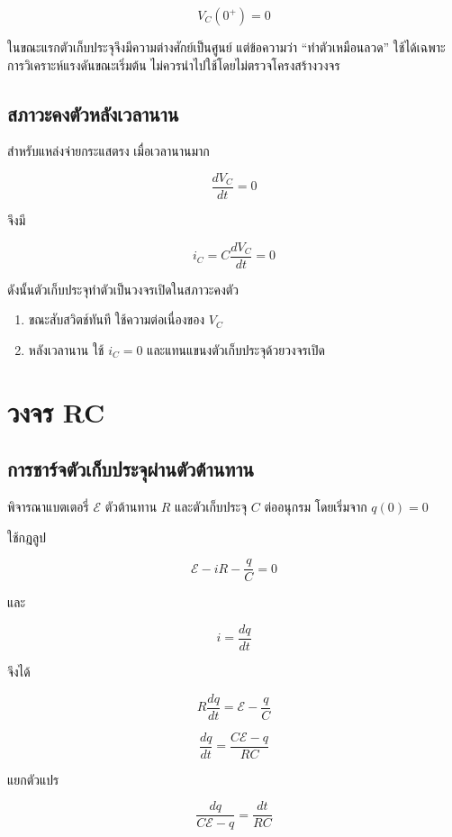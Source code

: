 \[
V_C(0^+)=0
\]

ในขณะแรกตัวเก็บประจุจึงมีความต่างศักย์เป็นศูนย์ แต่ข้อความว่า ``ทำตัวเหมือนลวด'' ใช้ได้เฉพาะการวิเคราะห์แรงดันขณะเริ่มต้น ไม่ควรนำไปใช้โดยไม่ตรวจโครงสร้างวงจร

\subsection{สภาวะคงตัวหลังเวลานาน}

สำหรับแหล่งจ่ายกระแสตรง เมื่อเวลานานมาก

\[
\frac{dV_C}{dt}=0
\]

จึงมี

\[
i_C=C\frac{dV_C}{dt}=0
\]

ดังนั้นตัวเก็บประจุทำตัวเป็นวงจรเปิดในสภาวะคงตัว

\begin{tcolorbox}[title={กฎวิเคราะห์ตัวเก็บประจุในวงจร DC}]
\begin{enumerate}
    \item ขณะสับสวิตช์ทันที ใช้ความต่อเนื่องของ $V_C$
    \item หลังเวลานาน ใช้ $i_C=0$ และแทนแขนงตัวเก็บประจุด้วยวงจรเปิด
\end{enumerate}
\end{tcolorbox}

\section{วงจร RC}

\subsection{การชาร์จตัวเก็บประจุผ่านตัวต้านทาน}

พิจารณาแบตเตอรี่ $\mathcal{E}$ ตัวต้านทาน $R$ และตัวเก็บประจุ $C$ ต่ออนุกรม โดยเริ่มจาก $q(0)=0$

ใช้กฎลูป

\[
\mathcal{E}-iR-\frac{q}{C}=0
\]

และ

\[
i=\frac{dq}{dt}
\]

จึงได้

\[
R\frac{dq}{dt}=\mathcal{E}-\frac{q}{C}
\]

\[
\frac{dq}{dt}=\frac{C\mathcal{E}-q}{RC}
\]

แยกตัวแปร

\[
\frac{dq}{C\mathcal{E}-q}=\frac{dt}{RC}
\]

